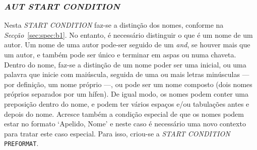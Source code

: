 \subsubsection{\emph{AUT \emph{START CONDITION}}}

Nesta \emph{START CONDITION} faz-se a distinção dos nomes, conforme na
\emph{Secção}~\ref{sec:spec:b1}. No entanto, é necessário distinguir o que é um
nome de um autor. Um nome de uma autor pode-ser seguido de um \emph{and}, se
houver mais que um autor, e também pode ser único e terminar em aspas ou numa
chaveta. Dentro do nome, faz-se a distinção de um nome poder ser uma inicial, ou
uma palavra que inicie com maiúscula, seguida de uma ou mais letras minúsculas
--- por definição, um nome próprio ---, ou pode ser um nome composto (dois nomes
próprios separados por um hífen). De igual modo, os nomes podem conter uma
preposição dentro do nome, e podem ter vários espaços e/ou tabulações antes
e depois do nome. Acresce também a condição especial de que os nomes podem estar
no formato `Apelido, Nome' e neste caso é necessário uma novo contexto para
tratar este caso especial. Para isso, criou-se a \emph{START CONDITION}
\texttt{PREFORMAT}. 



